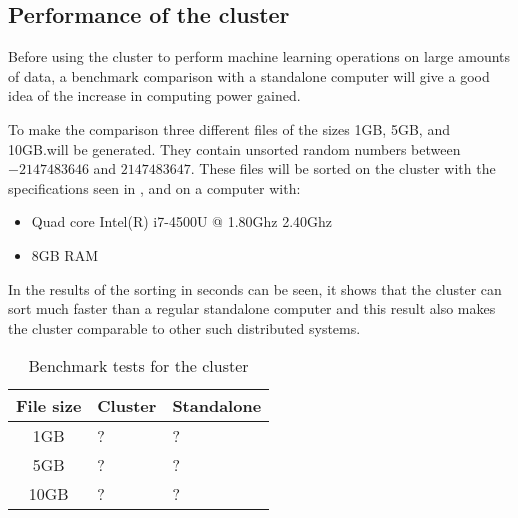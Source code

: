 \subsection{Performance of the cluster}\label{sec:benchmark}
Before using the cluster to perform machine learning operations on large amounts of data, a benchmark comparison with a standalone computer will give a good idea of the increase in computing power gained.

To make the comparison three different files of the sizes 1GB, 5GB, and 10GB.\@ will be generated. They contain unsorted random numbers between $-2147483646$ and $2147483647$. These files will be sorted on the cluster with the specifications seen in , and on a computer with:
\begin{itemize}
\item Quad core Intel(R) i7-4500U @ 1.80Ghz 2.40Ghz
\item 8GB RAM
\end{itemize}

In  the results of the sorting in seconds can be seen, it shows that the cluster can sort much faster than a regular standalone computer and this result also makes the cluster comparable to other such distributed systems.

\begin{table}[!htb]
  \centering
  \begin{tabular}{|c|ll|}
    \hline
    File size & Cluster  & Standalone \\
    \hline
    1GB & ? & ? \\
    5GB & ? & ? \\
    10GB & ? & ? \\
    \hline
  \end{tabular}
  \caption{Benchmark tests for the cluster}
  \label{tab:bench}
\end{table}




